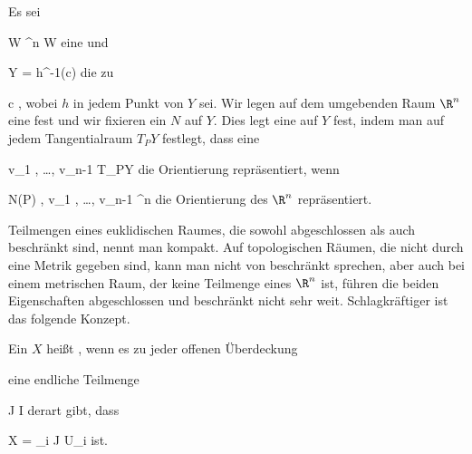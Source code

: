 {}
{

Es sei

\mavergleichskette
{\vergleichskette
{ W
}
{ \subseteq }{ \R^n
}
{  }{
}
{    }{
}
{   }{
}
}
{}{}{}
 { W } { \R
} {}
eine
und

\mavergleichskette
{\vergleichskette
{ Y
}
{ = }{ h^{-1}(c)
}
{  }{
}
{    }{
}
{   }{
}
}
{}{}{}
die
zu

\mavergleichskette
{\vergleichskette
{ c
}
{ \in }{ \R
}
{  }{
}
{    }{
}
{   }{
}
}
{}{}{,}
wobei $h$ in jedem Punkt von $Y$
sei. Wir legen auf dem umgebenden Raum $\R^n$ eine
fest
 {} {}
und wir fixieren ein
$N$ auf $Y$. Dies legt eine
auf $Y$
 {} {}
fest, indem man auf jedem Tangentialraum $T_PY$ festlegt, dass eine

\mavergleichskette
{\vergleichskette
{ v_1 , \ldots , v_{n-1}
}
{ \in }{ T_PY
}
{  }{
}
{    }{
}
{   }{
}
}
{}{}{}
die Orientierung repräsentiert, wenn

\mavergleichskette
{\vergleichskette
{ N(P) , v_1 , \ldots , v_{n-1}
}
{ \in }{ \R^n
}
{  }{
}
{    }{
}
{   }{
}
}
{}{}{}
die Orientierung des $\R^n$ repräsentiert.

}


Teilmengen eines euklidischen Raumes, die sowohl abgeschlossen als auch beschränkt sind, nennt man kompakt. Auf topologischen Räumen, die nicht durch eine Metrik gegeben sind, kann man nicht von beschränkt sprechen, aber auch bei einem metrischen Raum, der keine Teilmenge eines $\R^n$ ist, führen die beiden Eigenschaften abgeschlossen und beschränkt nicht sehr weit. Schlagkräftiger ist das folgende Konzept.

{}
{

Ein
$X$ heißt 
 {} {,}
wenn es zu jeder offenen Überdeckung

 {  }

eine endliche Teilmenge

\mavergleichskette
{\vergleichskette
{J
}
{ \subseteq }{ I
}
{  }{
}
{    }{
}
{   }{
}
}
{}{}{}
derart gibt, dass

\mavergleichskettedisp
{\vergleichskette
{ X
}
{ =} { \bigcup_{i \in J} U_i
}
{ } {
}
{ } {
}
{ } {
}
}
{}{}{}
ist.

}

